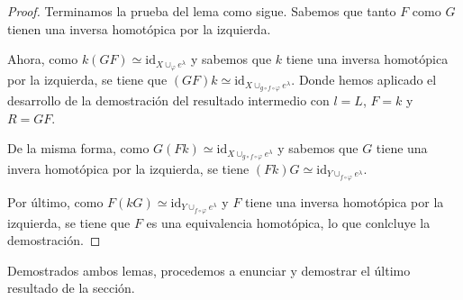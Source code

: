 \begin{proof}
    \bigskip

    Terminamos la prueba del lema como sigue. Sabemos que tanto $F$ como $G$ tienen una inversa homotópica por la izquierda. 

    Ahora, como $k(GF)\simeq \text{id}_{X\cup_{\varphi} e^{\lambda}}$ y sabemos que $k$ tiene una inversa homotópica por la izquierda, se tiene que $(GF)k\simeq \text{id}_{X\cup_{g\circ f\circ\varphi} e^{\lambda}}$. Donde hemos aplicado el desarrollo de la demostración del resultado intermedio con $l=L$, $F=k$ y $R=GF$.

    De la misma forma, como $G(Fk) \simeq \text{id}_{X\cup_{g\circ f\circ\varphi} e^{\lambda}}$ y sabemos que $G$ tiene una invera homotópica por la izquierda, se tiene $(Fk)G \simeq \text{id}_{Y\cup_{f\circ\varphi} e^{\lambda}}$.

    Por último, como $F(kG) \simeq \text{id}_{Y\cup_{f\circ\varphi} e^{\lambda}}$ y $F$ tiene una inversa homotópica por la izquierda, se tiene que $F$ es una equivalencia homotópica, lo que conlcluye la demostración.
\end{proof}

Demostrados ambos lemas, procedemos a enunciar y demostrar el último resultado de la sección. 

